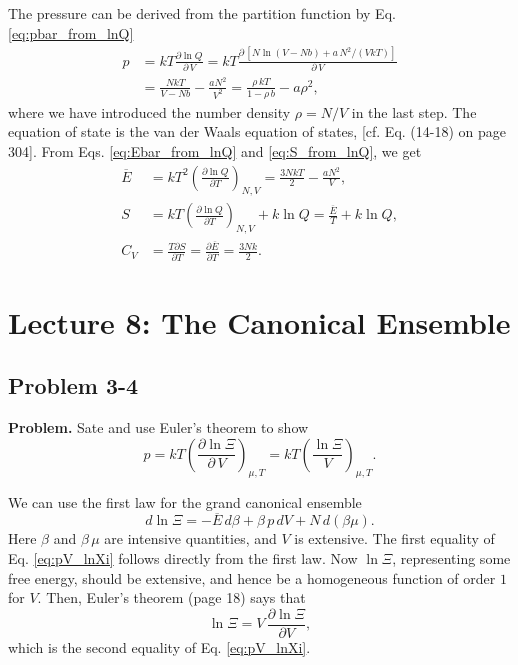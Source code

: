 \documentclass[twocolumn, 10pt]{article}
\numberwithin{equation}{section}
\newenvironment{problem}
{\par\medskip \color{problue}
  \textbf{Problem. }\ignorespaces}
{\medskip}
\newenvironment{solution}[1][\empty]
{\par\medskip\sffamily
  \textbf{\ifx\empty#1{Solution.}\relax\else{#1}\fi} \ignorespaces}
{\medskip}
\begin{document}
\begin{solution}
The pressure can be derived from the partition function
by Eq. \eqref{eq:pbar_from_lnQ}
%
\begin{align*}
p &=
  kT \frac{ \partial \ln Q } { \partial \, V }
=
  kT \frac{ \partial \, [ N \ln (V - N b)
   + a \, N^2 / (V k T)] }
  { \partial \, V }
\\
&=
  \frac{ N k T } { V - N b} - \frac{ a N^2 }{ V^2 }
=
  \frac{ \rho \, k T } { 1 - \rho \, b} - a \rho^2
,
\end{align*}
%
where we have introduced
the number density $\rho = N/V$ in the last step.
%
The equation of state is the van der Waals equation of states,
  [cf. Eq. (14-18) on page 304].
%
From Eqs. \eqref{eq:Ebar_from_lnQ} and \eqref{eq:S_from_lnQ},
we get
\begin{align*}
\overline E
&=
    kT^2 \left(
      \frac{ \partial \ln Q }
           { \partial T }
    \right)_{N, V}
=
  \frac{ 3 N k T }{2}
  -\frac{ a N^2 } { V}
,
\\
S
&=
    kT \left(
      \frac{ \partial \ln Q }
           { \partial T }
    \right)_{N, V}
    + k \ln Q
=
  \frac{ \overline E } { T }
  + k \ln Q
,
\\
C_V
&=
\frac{ T \partial S } { \partial T }
=
\frac{ \partial \overline E } { \partial T }
= \frac{ 3 N k}{2}
.
\end{align*}
\end{solution}

\section{Lecture 8: The Canonical Ensemble}

\subsection{Problem 3-4}

\begin{problem}
  Sate and use Euler's theorem to show
  \begin{equation}
  p
  = kT \left(
    \frac{ \partial \ln \Xi } { \partial \, V }
    \right)_{\mu, T}
  = kT \left(
    \frac{ \ln \Xi } { V }
    \right)_{\mu, T}
  .
    \label{eq:pV_lnXi}
  \end{equation}
\end{problem}

\begin{solution}
We can use the first law for the grand canonical ensemble
$$
d\ln\Xi = -\overline E \, d\beta + \beta \, p \, d V + N \, d(\beta\mu).
$$
Here $\beta$ and $\beta\,\mu$
are intensive quantities, and $V$ is extensive.
%
The first equality of Eq. \eqref{eq:pV_lnXi}
follows directly from the first law.
%
Now $\ln\Xi$, representing some free energy,
should be extensive,
and hence be a homogeneous function of order $1$
for $V$.
%
Then, Euler's theorem (page 18) says that
$$
\ln\Xi = V \, \frac{ \partial \ln \Xi } { \partial V },
$$
which is the second equality of Eq. \eqref{eq:pV_lnXi}.
\end{solution}
\end{document}
